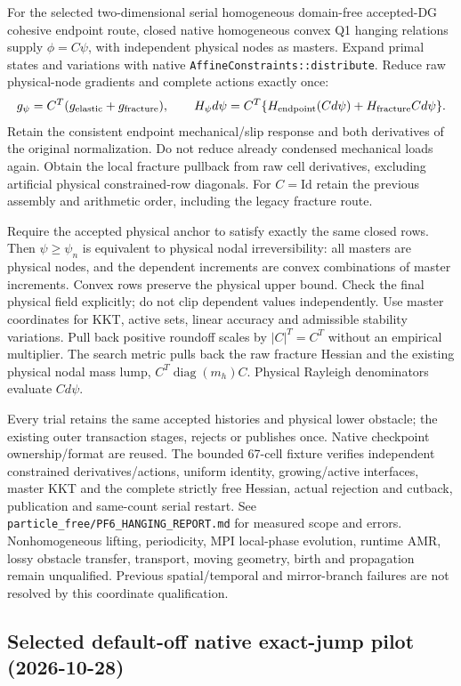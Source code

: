 \documentclass[11pt]{article}
\begin{document}
For the selected two-dimensional serial homogeneous domain-free accepted-DG
cohesive endpoint route, closed native homogeneous convex Q1 hanging relations
supply $\phi=C\psi$, with independent physical nodes as masters. Expand primal
states and variations with native \texttt{AffineConstraints::distribute}.
Reduce raw physical-node gradients and complete actions exactly once:
\[
 g_\psi=C^T(g_{\rm elastic}+g_{\rm fracture}),\qquad
 H_\psi d\psi=C^T\{H_{\rm endpoint}(Cd\psi)+H_{\rm fracture}Cd\psi\}.
\]
Retain the consistent endpoint mechanical/slip response and both derivatives of
the original normalization. Do not reduce already condensed mechanical loads
again. Obtain the local fracture pullback from raw cell derivatives, excluding
artificial physical constrained-row diagonals. For $C=\mathrm{Id}$ retain the
previous assembly and arithmetic order, including the legacy fracture route.

Require the accepted physical anchor to satisfy exactly the same closed rows.
Then $\psi\geq\psi_n$ is equivalent to physical nodal irreversibility: all masters
are physical nodes, and the dependent increments are convex combinations of
master increments. Convex rows preserve the physical upper bound. Check the
final physical field explicitly; do not clip dependent values independently.
Use master coordinates for KKT, active sets, linear accuracy and admissible
stability variations. Pull back positive roundoff scales by $|C|^T=C^T$ without
an empirical multiplier. The search metric pulls back the raw fracture Hessian
and the existing physical nodal mass lump, $C^T\operatorname{diag}(m_h)C$.
Physical Rayleigh denominators evaluate $Cd\psi$.

Every trial retains the same accepted histories and physical lower obstacle;
the existing outer transaction stages, rejects or publishes once. Native
checkpoint ownership/format are reused. The bounded 67-cell fixture verifies
independent constrained derivatives/actions, uniform identity, growing/active
interfaces, master KKT and the complete strictly free Hessian, actual rejection
and cutback, publication and same-count serial restart. See
\texttt{particle\_free/PF6\_HANGING\_REPORT.md} for measured scope and errors.
Nonhomogeneous lifting, periodicity, MPI local-phase evolution, runtime AMR,
lossy obstacle transfer, transport, moving geometry, birth and propagation
remain unqualified. Previous spatial/temporal and mirror-branch failures are
not resolved by this coordinate qualification.


\subsection{Selected default-off native exact-jump pilot (2026-10-28)}
\end{document}
